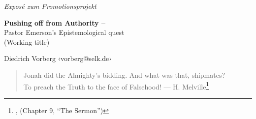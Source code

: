 \documentclass[a4paper,12pt,english]{article}
\newcommand{\de}[1]{{\it\foreignlanguage{german}{#1}}\xspace}
\begin{document}
\noindent
\de{Exposé zum Promotionsprojekt}

\vspace{1em}

\doublespacing
\noindent
\Large{\bf Pushing off from Authority – }\\
Pastor Emerson’s Epistemological quest\\
\small{(Working title)}

\vspace{1em}

\noindent
Diedrich Vorberg ‹vorberg@selk.de›

\begin{quote}
  Jonah did the Almighty’s bidding. And what was that, shipmates? \\
  To preach the Truth to the face of Falsehood!
  — H. Melville\footnote{\cite[49]{MobyDick}, (Chapter 9, “The Sermon”)}

\end{quote}
\end{document}
